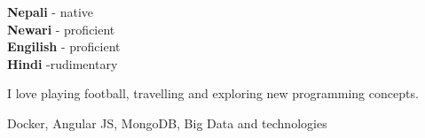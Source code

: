 \documentclass[9pt]{developercv} %
\begin{document}

\begin{minipage}[t]{0.3\textwidth}
	\vspace{-\baselineskip} %

	
	\textbf{Nepali} - native\\
	\textbf{Newari} - proficient\\
	\textbf{Engilish} - proficient\\
	\textbf{Hindi} -rudimentary
\end{minipage}
\hfill
\begin{minipage}[t]{0.3\textwidth}
	\vspace{-\baselineskip} %
	
	
	I love playing football, travelling and exploring new programming concepts.
\end{minipage}
\hfill
\begin{minipage}[t]{0.3\textwidth}
	\vspace{-\baselineskip} %
	
	
	Docker, Angular JS, MongoDB, Big Data and technologies
\end{minipage}

\end{document}
